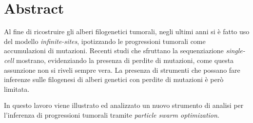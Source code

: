 \null{}
\chapter*{\centering Abstract}

Al fine di ricostruire gli alberi filogenetici tumorali, negli ultimi anni si è fatto uso del modello \textit{infinite-sites}, ipotizzando le progressioni tumorali come accumulazioni di mutazioni. Recenti studi che sfruttano la sequenziazione \textit{single-cell} mostrano, evidenziando la presenza di perdite di mutazioni, come questa assunzione non si riveli sempre vera. La presenza di strumenti che possano fare inferenze sulle filogenesi di alberi genetici con perdite di mutazioni è però limitata.

In questo lavoro viene illustrato ed analizzato un nuovo strumento di analisi per l'inferenza di progressioni tumorali tramite \textit{particle swarm optimization}.

 \null
\newpage